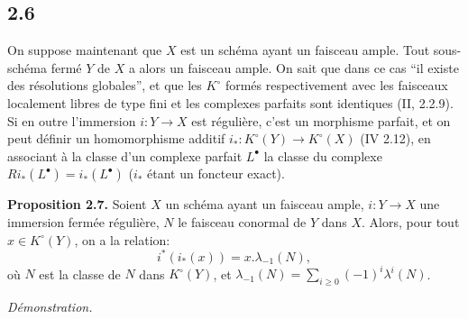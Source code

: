 \subsection*{2.6}
On suppose maintenant que \(X\) est un schéma ayant un faisceau ample. Tout sous-schéma fermé \(Y\) de \(X\) a alors un faisceau ample. On sait que dans ce cas ``il existe des résolutions globales'', et que les \(K^\circ\) formés respectivement avec les faisceaux localement libres de type fini et les complexes parfaits sont identiques (II, 2.2.9). Si en outre l'immersion \(i:Y\to X\) est régulière, c'est un morphisme parfait, et on peut définir un homomorphisme additif \(i_*:K^\circ(Y)\longrightarrow K^\circ(X)\) (IV 2.12), en associant à la classe d'un complexe parfait \(L^\bullet\) la classe du complexe \(Ri_*(L^\bullet)=i_*(L^\bullet)\) (\(i_*\) étant un foncteur exact).

\textbf{Proposition 2.7.} Soient \(X\) un schéma ayant un faisceau ample, \(i:Y\to X\) une immersion fermée régulière, \(N\) le faisceau conormal de \(Y\) dans \(X\). Alors, pour tout \(x\in K^\circ(Y)\), on a la relation:
\begin{equation}\tag{2.7.1}
i^*(i_*(x))=x.\lambda_{-1}(N),
\end{equation}
où \(N\) est la classe de \(N\) dans \(K^\circ(Y)\), et \(\lambda_{-1}(N)=\sum_{i\ge0}(-1)^i\lambda^i(N)\).

\emph{Démonstration.}
